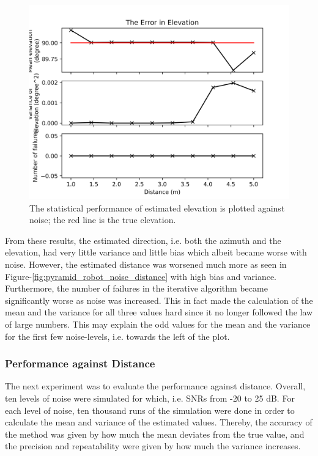 \documentclass[notitlepage]{report}
\begin{document}
\begin{figure}[H]
\includegraphics[width=1\textwidth]{../Python/pyramid_robot/noise/elevation.png}
\centering
\caption{The statistical performance of estimated elevation is plotted against noise; the red line is the true elevation.}
\label{fig:pyramid_robot_noise_elevation}
\centering
\end{figure}

From these results, the estimated direction, i.e. both the azimuth and the elevation, had very little variance and little bias which albeit became worse with noise. However, the estimated distance was worsened much more as seen in Figure-\ref{fig:pyramid_robot_noise_distance} with high bias and variance. Furthermore, the number of failures in the iterative algorithm became significantly worse as noise was increased. This in fact made the calculation of the mean and the variance for all three values hard since it no longer followed the law of large numbers. This may explain the odd values for the mean and the variance for the first few noise-levels, i.e. towards the left of the plot.

\subsubsection{Performance against Distance}

The next experiment was to evaluate the performance against distance. Overall, ten levels of noise were simulated for which, i.e. SNRs from -20 to 25 \si{dB}. For each level of noise, ten thousand runs of the simulation were done in order to calculate the mean and variance of the estimated values. Thereby, the accuracy of the method was given by how much the mean deviates from the true value, and the precision and repeatability were given by how much the variance increases.
\end{document}
